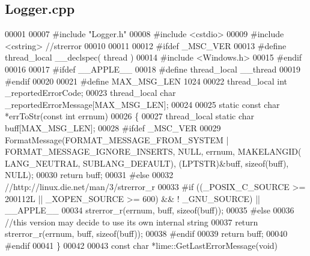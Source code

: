 \subsection{Logger.\+cpp}
\label{limesuite-dev_2src_2Logger_8cpp_source}

\begin{DoxyCode}
00001 
00007 \textcolor{preprocessor}{#include "Logger.h"}
00008 \textcolor{preprocessor}{#include <cstdio>}
00009 \textcolor{preprocessor}{#include <cstring>} \textcolor{comment}{//strerror}
00010 
00011 
00012 \textcolor{preprocessor}{#ifdef \_MSC\_VER}
00013 \textcolor{preprocessor}{    #define thread\_local \_\_declspec( thread )}
00014 \textcolor{preprocessor}{    #include <Windows.h>}
00015 \textcolor{preprocessor}{#endif}
00016 
00017 \textcolor{preprocessor}{#ifdef \_\_APPLE\_\_}
00018 \textcolor{preprocessor}{    #define thread\_local \_\_thread}
00019 \textcolor{preprocessor}{#endif}
00020 
00021 \textcolor{preprocessor}{#define MAX\_MSG\_LEN 1024}
00022 thread\_local \textcolor{keywordtype}{int} _reportedErrorCode;
00023 thread\_local \textcolor{keywordtype}{char} _reportedErrorMessage[MAX_MSG_LEN];
00024 
00025 \textcolor{keyword}{static} \textcolor{keyword}{const} \textcolor{keywordtype}{char} *errToStr(\textcolor{keyword}{const} \textcolor{keywordtype}{int} errnum)
00026 \{
00027     thread\_local \textcolor{keyword}{static} \textcolor{keywordtype}{char} buff[MAX_MSG_LEN];
00028 \textcolor{preprocessor}{    #ifdef \_MSC\_VER}
00029     FormatMessage(FORMAT\_MESSAGE\_FROM\_SYSTEM | FORMAT\_MESSAGE\_IGNORE\_INSERTS, NULL, errnum, MAKELANGID(
      LANG\_NEUTRAL, SUBLANG\_DEFAULT), (LPTSTR)&buff, \textcolor{keyword}{sizeof}(buff), NULL);
00030     \textcolor{keywordflow}{return} buff;
00031 \textcolor{preprocessor}{    #else}
00032     \textcolor{comment}{//http://linux.die.net/man/3/strerror\_r}
00033 \textcolor{preprocessor}{    #if ((\_POSIX\_C\_SOURCE >= 200112L || \_XOPEN\_SOURCE >= 600) && ! \_GNU\_SOURCE) || \_\_APPLE\_\_}
00034     strerror\_r(errnum, buff, \textcolor{keyword}{sizeof}(buff));
00035 \textcolor{preprocessor}{    #else}
00036     \textcolor{comment}{//this version may decide to use its own internal string}
00037     \textcolor{keywordflow}{return} strerror\_r(errnum, buff, \textcolor{keyword}{sizeof}(buff));
00038 \textcolor{preprocessor}{    #endif}
00039     \textcolor{keywordflow}{return} buff;
00040 \textcolor{preprocessor}{    #endif}
00041 \}
00042 
00043 \textcolor{keyword}{const} \textcolor{keywordtype}{char} *lime::GetLastErrorMessage(\textcolor{keywordtype}{void})

\end{DoxyCode}
